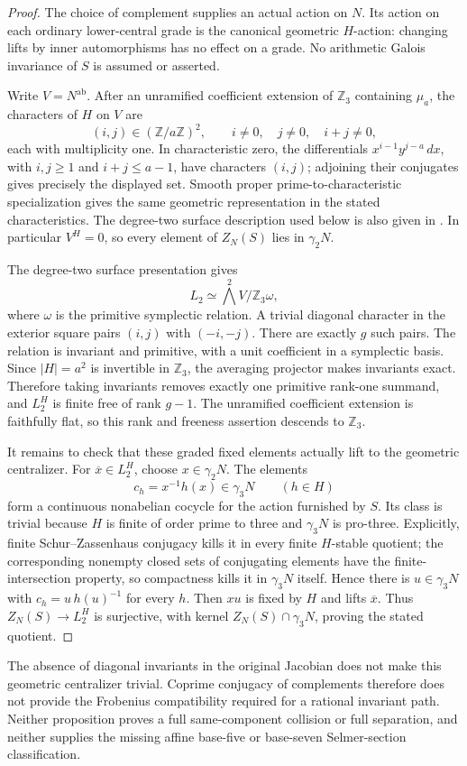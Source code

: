 \begin{proof}
The choice of complement supplies an actual action on $N$.
Its action on each ordinary lower-central grade is the canonical
geometric $H$-action: changing lifts by inner automorphisms has
no effect on a grade. No arithmetic Galois invariance of $S$ is
assumed or asserted.

Write $V=N^{\mathrm{ab}}$. After an unramified coefficient
extension of $\mathbb Z_3$ containing $\mu_a$, the characters of
$H$ on $V$ are
\[
 (i,j)\in(\mathbb Z/a\mathbb Z)^2,
 \qquad i\ne0,\quad j\ne0,\quad i+j\ne0,
\]
each with multiplicity one. In characteristic zero, the
differentials $x^{i-1}y^{j-a}\,dx$, with $i,j\ge1$ and
$i+j\le a-1$, have characters $(i,j)$; adjoining their conjugates
gives precisely the displayed set. Smooth proper
prime-to-characteristic specialization gives the same geometric
representation in the stated characteristics. The degree-two
surface description used below is also given in
\citet[author pp.~2--4]{DavisPriesWickelgren2024}.
In particular $V^H=0$, so every element of $Z_N(S)$ lies in
$\gamma_2N$.

The degree-two surface presentation gives
\[
 L_2\simeq\bigwedge^2V/\mathbb Z_3\omega,
\]
where $\omega$ is the primitive symplectic relation. A trivial
diagonal character in the exterior square pairs $(i,j)$ with
$(-i,-j)$. There are exactly $g$ such pairs. The relation is
invariant and primitive, with a unit coefficient in a symplectic
basis. Since $|H|=a^2$ is invertible in $\mathbb Z_3$, the
averaging projector makes invariants exact. Therefore taking
invariants removes exactly one primitive rank-one summand,
and $L_2^H$ is finite free of rank $g-1$. The unramified
coefficient extension is faithfully flat, so this rank and
freeness assertion descends to $\mathbb Z_3$.

It remains to check that these graded fixed elements actually
lift to the geometric centralizer. For
$\overline x\in L_2^H$, choose $x\in\gamma_2N$.
The elements
\[
 c_h=x^{-1}h(x)\in\gamma_3N\qquad(h\in H)
\]
form a continuous nonabelian cocycle for the action furnished by
$S$. Its class is trivial because $H$ is finite of order prime
to three and $\gamma_3N$ is pro-three. Explicitly, finite
Schur--Zassenhaus conjugacy kills it in every finite
$H$-stable quotient; the corresponding nonempty closed sets of
conjugating elements have the finite-intersection property, so
compactness kills it in $\gamma_3N$ itself. Hence there is
$u\in\gamma_3N$ with $c_h=u\,h(u)^{-1}$ for every $h$.
Then $xu$ is fixed by $H$ and lifts $\overline x$.
Thus $Z_N(S)\to L_2^H$ is surjective, with kernel
$Z_N(S)\cap\gamma_3N$, proving the stated quotient.
\end{proof}

The absence of diagonal invariants in the original Jacobian does
not make this geometric centralizer trivial. Coprime conjugacy
of complements therefore does not provide the Frobenius
compatibility required for a rational invariant path. Neither
proposition proves a full same-component collision or full
separation, and neither supplies the missing affine
base-five or base-seven Selmer-section classification.
